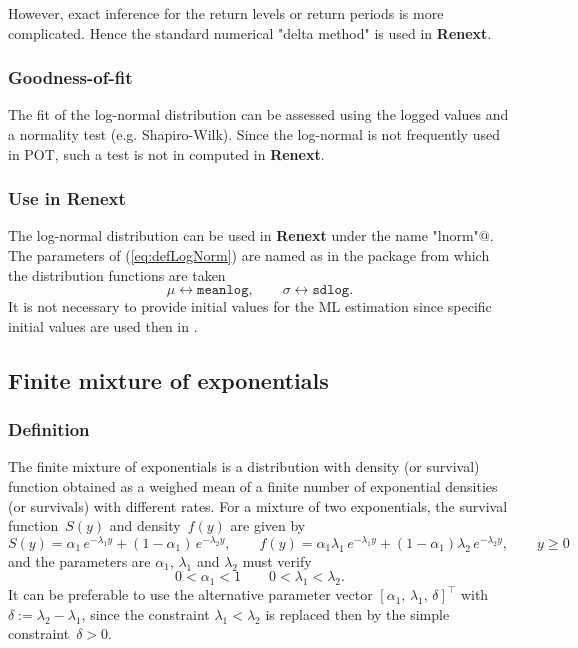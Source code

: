 \documentclass[a4paper]{report}
\newcommand{\pkg}[1]{\textbf{#1}}
\begin{document}
However, exact inference for the return levels
or return periods is more complicated. Hence the standard numerical
"delta method" is used in \textbf{Renext}.

\subsubsection{Goodness-of-fit}
The fit of the log-normal distribution can be assessed using the 
logged values and a normality test (e.g. Shapiro-Wilk). 
Since the log-normal is not frequently used in POT, such a test is
not in computed in \textbf{Renext}.

\subsubsection*{Use in Renext}
The log-normal distribution  can be used in \pkg{Renext} under the name \verb@"lnorm"@. The 
parameters of (\ref{eq:defLogNorm}) are named as in the \verb@stats@ package from
which the distribution functions are taken
$$
   \mu \leftrightarrow \texttt{meanlog}, \qquad \sigma \leftrightarrow \texttt{sdlog}.
$$
It is not necessary to provide initial values for the ML estimation since 
specific initial values are used then in \verb@Renouv@.



\subsection{Finite mixture of exponentials}
\subsubsection*{Definition}
The finite mixture of exponentials is a distribution with density
(or survival) function obtained as a weighed mean of a finite number
of exponential densities (or survivals) with  different rates. 
For a mixture of two exponentials, the survival function~$S(y)$  
and density~$f(y)$ are given by
\begin{equation}
  \label{eq:defMixExp2}
   S(y) = \alpha_1\,e^{-\lambda_1 y} + (1-\alpha_1)\,e^{-\lambda_2 y}, \qquad
   f(y) = \alpha_1\lambda_1\,e^{-\lambda_1 y} + (1-\alpha_1)\lambda_2\,e^{-\lambda_2 y},
   \qquad y \geqslant 0
\end{equation}
and the parameters are $\alpha_1$, $\lambda_1$ and $\lambda_2$ must verify
\begin{equation}
   \label{eq:MIXEXPCONTR}
   0 < \alpha_1 < 1 \qquad 0 < \lambda_1 < \lambda_2.
\end{equation}
It can be preferable to use the alternative parameter vector
$[\alpha_1,\, \lambda_1, \, \delta]^\top$ with $\delta := \lambda_2-
\lambda_1$, since the constraint $\lambda_1 < \lambda_2$ is replaced
then by the simple constraint~$\delta >0$.
\end{document}
